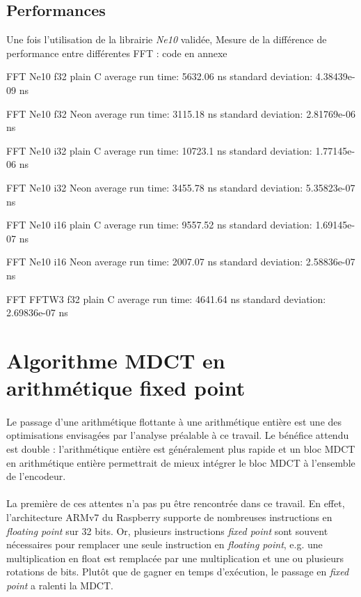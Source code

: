 \documentclass{article}
\begin{document}
    \subsection{Performances}
    Une fois l'utilisation de la librairie \emph{Ne10} validée,  Mesure de la différence de performance entre différentes FFT : code en annexe

    FFT Ne10 f32 plain C
    average run time:   5632.06 ns
    standard deviation: 4.38439e-09 ns

    FFT Ne10 f32 Neon
    average run time:   3115.18 ns
    standard deviation: 2.81769e-06 ns

    FFT Ne10 i32 plain C
    average run time:   10723.1 ns
    standard deviation: 1.77145e-06 ns

    FFT Ne10 i32 Neon
    average run time:   3455.78 ns
    standard deviation: 5.35823e-07 ns

    FFT Ne10 i16 plain C
    average run time:   9557.52 ns
    standard deviation: 1.69145e-07 ns

    FFT Ne10 i16 Neon
    average run time:   2007.07 ns
    standard deviation: 2.58836e-07 ns

    FFT FFTW3 f32 plain C
    average run time:   4641.64 ns
    standard deviation: 2.69836e-07 ns



    \section{Algorithme MDCT en arithmétique fixed point}
    \label{sec:fixed_point}
    \paragraph{}
    Le passage d'une arithmétique flottante à une arithmétique entière est une des optimisations envisagées par l'analyse préalable à ce travail. Le bénéfice attendu est double : l'arithmétique entière est généralement plus rapide et un bloc MDCT en arithmétique entière permettrait de mieux intégrer le bloc MDCT à l'ensemble de l'encodeur.

    \paragraph{}
    La première de ces attentes n'a pas pu être rencontrée dans ce travail. En effet, l'architecture ARMv7 du Raspberry supporte de nombreuses instructions en \emph{floating point} sur 32 bits\cite{DOC-ARM}. Or, plusieurs instructions \emph{fixed point} sont souvent nécessaires pour remplacer une seule instruction en \emph{floating point}, e.g. une multiplication en float est remplacée par une multiplication et une ou plusieurs rotations de bits. Plutôt que de gagner en temps d'exécution, le passage en \emph{fixed point} a ralenti la MDCT.
\end{document}
